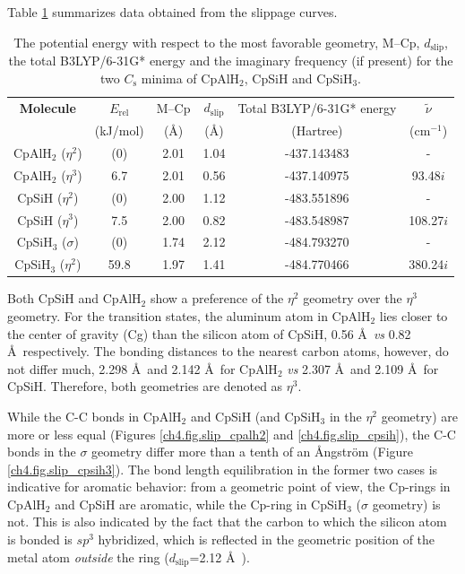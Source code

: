 Table \ref{ch4.tab.slip} summarizes data obtained from the slippage curves.
\begin{table}[htbp]
\center
\caption{The potential energy with respect to the most favorable geometry, M--Cp, $d_\mathrm{slip}$, the total B3LYP/6-31G* energy and the imaginary frequency (if present) for the two $C_\mathrm{s}$ minima of CpAlH$_2$, CpSiH and CpSiH$_3$.}
\begin{tabular}{|c|c|c|c|c|c|}
\hline
\textbf{Molecule}&
$E_\mathrm{rel}$&
M--Cp&
$d_\mathrm{slip}$&Total B3LYP/6-31G* energy&
$\tilde{\nu}$\\
&(kJ/mol)&(\AA)&(\AA)&(Hartree)& (cm$^{-1}$)\\
\hline
CpAlH$_2$ ($\eta^{2}$) & (0)  & 2.01 & 1.04 & -437.143483 & -\\
CpAlH$_2$ ($\eta^{3}$) & 6.7  & 2.01 & 0.56 & -437.140975 & 93.48$i$ \\
CpSiH ($\eta^{2}$) & (0)  & 2.00 & 1.12 & -483.551896 & -\\
CpSiH ($\eta^{3}$) & 7.5  & 2.00 & 0.82 & -483.548987 & 108.27$i$ \\
CpSiH$_3$ ($\sigma$) & (0)  & 1.74 & 2.12 & -484.793270 & - \\
CpSiH$_3$ ($\eta^{2}$) & 59.8 & 1.97 & 1.41 & -484.770466 & 380.24$i$ \\
\hline
\end{tabular}
\label{ch4.tab.slip}
\end{table}
Both CpSiH and CpAlH$_2$ show a preference of the $\eta^{2}$ geometry over the $\eta^{3}$ geometry. For the transition states, the aluminum atom in CpAlH$_2$ lies closer to the center of gravity (Cg) than the silicon atom of CpSiH, 0.56 \AA\ \textit{vs} 0.82 \AA\ respectively. The bonding distances to the nearest carbon atoms, however, do not differ much, 2.298 \AA\ and 2.142 \AA\ for CpAlH$_2$ \textit{vs} 2.307 \AA\ and 2.109 \AA\ for CpSiH. Therefore, both geometries are denoted as $\eta^{3}$.

While the C-C bonds in CpAlH$_2$ and CpSiH (and CpSiH$_3$ in the $\eta^2$ geometry) are more or less equal (Figures \ref{ch4.fig.slip_cpalh2} and \ref{ch4.fig.slip_cpsih}), the C-C bonds in the $\sigma$ geometry differ more than a tenth of an \AA ngstr\"{o}m (Figure \ref{ch4.fig.slip_cpsih3}). The bond length equilibration in the former two cases is indicative for aromatic behavior: from a geometric point of view, the Cp-rings in CpAlH$_2$ and CpSiH are aromatic, while the Cp-ring in CpSiH$_3$ ($\sigma$ geometry) is not. This is also indicated by the fact that the carbon to which the silicon atom is bonded is $sp^3$ hybridized, which is reflected in the geometric position of the metal atom \textit{outside} the ring ($d_\mathrm{slip}$=2.12 \AA\ ). 

